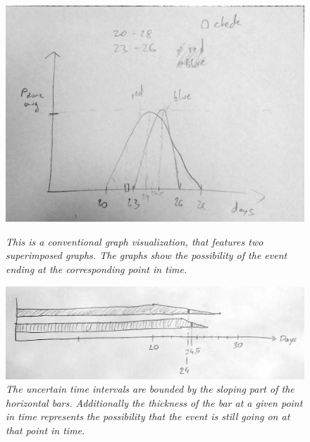 \begin{figure}[H]
	\begin{minipage}{.5\textwidth}
		\centering
		\captionsetup{width=0.8\textwidth}
		\includegraphics[height=0.5\textwidth]{figures/t2graph.jpg}
		\caption{\textit{This is a conventional graph visualization, that features two superimposed graphs. The graphs show the possibility of the event ending at the corresponding point in time.}}
		\label{fig:t2graph}
	\end{minipage}
	\begin{minipage}{.5\textwidth}
		\centering
		\captionsetup{width=1.0\textwidth}
		\includegraphics[height=0.33\textwidth]{figures/t2length.jpg}
		\caption{\textit{The uncertain time intervals are bounded by the sloping part of the horizontal bars. Additionally the thickness of the bar at a given point in time represents the possibility that the event is still going on at that point in time.}}
		\label{fig:t2length}
	\end{minipage}
\end{figure}
